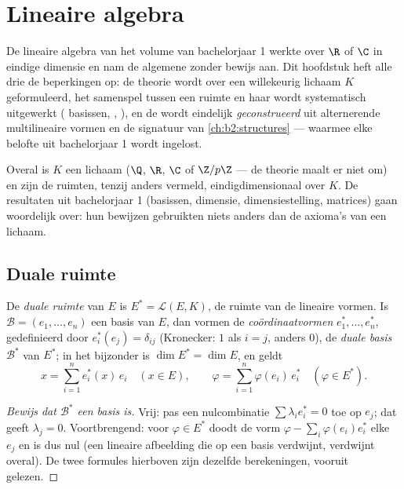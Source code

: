 \chapter{Lineaire algebra}\label{ch:b2:linalg}

De lineaire algebra van het volume van bachelorjaar 1 werkte over
$\R$ of $\C$ in eindige dimensie en nam de algemene 
zonder bewijs aan. Dit hoofdstuk heft alle drie de beperkingen op:
de theorie wordt over een willekeurig lichaam $K$ geformuleerd, het
samenspel tussen een ruimte en haar \emph{} wordt systematisch
uitgewerkt ( basissen, , ), en de
 wordt eindelijk \emph{geconstrueerd} uit alternerende
multilineaire vormen en de signatuur van
\cref{ch:b2:structures} --- waarmee elke belofte uit bachelorjaar 1
wordt ingelost.

Overal is $K$ een lichaam ($\Q$, $\R$, $\C$ of $\Z/p\Z$ --- de
theorie maalt er niet om) en zijn de ruimten, tenzij anders vermeld,
eindigdimensionaal over $K$. De resultaten uit bachelorjaar 1
(basissen, dimensie, dimensiestelling, matrices) gaan woordelijk
over: hun bewijzen gebruikten niets anders dan de axioma's van een
lichaam.

\section{Duale ruimte}

\begin{definition}\label{def:b2:linalg:dual}
De \emph{duale ruimte} van $E$ is $E^* =
\mathcal{L}(E, K)$, de ruimte van de lineaire vormen. Is
$\mathcal{B} = (e_1, \dots, e_n)$ een basis van $E$, dan vormen de
\emph{coördinaatvormen} $e_1^*, \dots, e_n^*$, gedefinieerd door
$e_i^*(e_j) = \delta_{ij}$ (Kronecker: $1$ als $i = j$, anders
$0$), de \emph{duale basis} $\mathcal{B}^*$ van
$E^*$; in het bijzonder is $\dim E^* = \dim E$, en geldt
\[
x = \sum_{i=1}^{n} e_i^*(x)\, e_i \quad (x \in E),
\qquad
\varphi = \sum_{i=1}^{n} \varphi(e_i)\, e_i^* \quad (\varphi \in
E^*).
\]
\end{definition}

\begin{proof}[Bewijs dat $\mathcal{B}^*$ een basis is]
Vrij: pas een nulcombinatie $\sum \lambda_i e_i^* = 0$ toe op
$e_j$; dat geeft $\lambda_j = 0$. Voortbrengend: voor $\varphi \in
E^*$ doodt de vorm $\varphi - \sum_i \varphi(e_i) e_i^*$ elke
$e_j$ en is dus nul (een lineaire afbeelding die op een basis
verdwijnt, verdwijnt overal). De twee formules hierboven zijn
dezelfde berekeningen, vooruit gelezen.
\end{proof}


